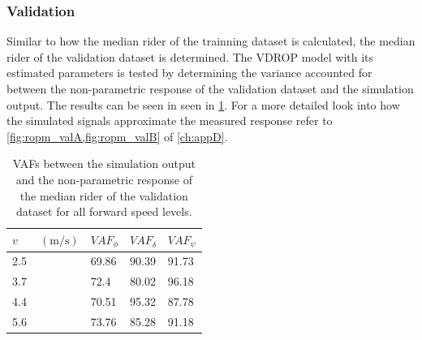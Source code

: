 \subsubsection{Validation}
Similar to how the median rider of the trainning dataset is calculated, the median rider of the validation dataset is determined. The VDROP model with its estimated parameters is tested by determining the variance accounted for between the non-parametric response of the  validation dataset and the simulation output. The results can be seen in seen in \cref{tb:validation}. For a more detailed look into  how the simulated signals approximate the measured response refer to \cref{fig:ropm_valA,fig:ropm_valB} of \cref{ch:appD}.
\begin{table}[!h]
  
    \centering
    \caption{VAFs between the simulation output and the non-parametric response of the median rider of the validation dataset for all forward speed levels.}
    \begin{tabular}{l|lll}
        \label{tb:validation}
    $v\;\;\;\;\;\;\; (\si{\meter\per\second})$ & $\mathit{VAF}_\phi$ & $\mathit{VAF}_\delta$ & $\mathit{VAF}_\psi$ \\ \hline
    2.5                        & 69.86               & 90.39                 & 91.73               \\
    3.7                        & 72.4               & 80.02                 & 96.18               \\
    4.4                        & 70.51              & 95.32                 & 87.78               \\
    5.6                        & 73.76              & 85.28                 & 91.18              
    \end{tabular}
    \end{table}

